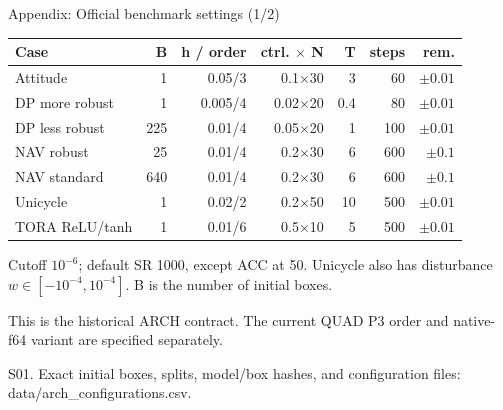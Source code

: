 \documentclass[aspectratio=169,11pt]{beamer}
\newcommand{\src}[1]{\par\vfill{\fontsize{7}{9}\selectfont\color{gray}#1\par}}
\begin{document}
\begin{frame}[t]{Appendix: Official benchmark settings (1/2)}
\relax
\relax
{\footnotesize\setlength{\tabcolsep}{3.2pt}\renewcommand{\arraystretch}{1.18}
\noindent\begin{tabular*}{\linewidth}{@{\extracolsep{\fill}}lrrrrrr@{}}\toprule
\textbf{Case} & \textbf{B} & \textbf{h / order} & \textbf{ctrl. \(\times\) N} & \textbf{T} & \textbf{steps} & \textbf{rem.}\\ \midrule
Attitude & 1 & 0.05/3 & 0.1\(\times\)30 & 3 & 60 & \(\pm0.01\)\\
DP more robust & 1 & 0.005/4 & 0.02\(\times\)20 & 0.4 & 80 & \(\pm0.01\)\\
DP less robust & 225 & 0.01/4 & 0.05\(\times\)20 & 1 & 100 & \(\pm0.01\)\\
NAV robust & 25 & 0.01/4 & 0.2\(\times\)30 & 6 & 600 & \(\pm0.1\)\\
NAV standard & 640 & 0.01/4 & 0.2\(\times\)30 & 6 & 600 & \(\pm0.1\)\\
Unicycle & 1 & 0.02/2 & 0.2\(\times\)50 & 10 & 500 & \(\pm0.01\)\\
TORA ReLU/tanh & 1 & 0.01/6 & 0.5\(\times\)10 & 5 & 500 & \(\pm0.01\)\\
\bottomrule\end{tabular*}\par{}}\vspace{0.3cm}Cutoff \(10^{-6}\); default SR 1000, except ACC at 50. Unicycle also has disturbance \(w\in[-10^{-4},10^{-4}]\). B is the number of initial boxes.\par{}This is the historical ARCH contract. The current QUAD P3 order and native-f64 variant are specified separately.
\src{S01. Exact initial boxes, splits, model/box hashes, and configuration files: data/arch\_configurations.csv.}
\end{frame}
\end{document}
